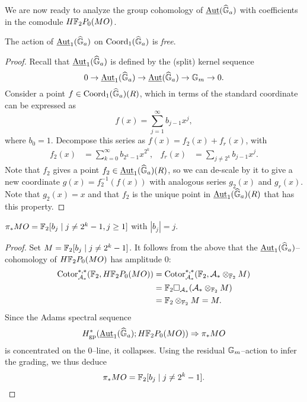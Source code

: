 We are now ready to analyze the group cohomology of $\operatorname{\underline{\smash{\operatorname{Aut}}}}(\widehat{\mathbb G}_a)$ with coefficients in the comodule $H\mathbb F_2P_0(MO)$.
\begin{theorem}
The action of $\operatorname{\underline{\smash{\operatorname{Aut}}}}_1(\widehat{\mathbb G}_a)$ on $\operatorname{Coord}_1(\widehat{\mathbb G}_a)$ is \emph{free}.
\end{theorem}
\begin{proof}
Recall that $\operatorname{\underline{\smash{\operatorname{Aut}}}}_1(\widehat{\mathbb G}_a)$ is defined by the (split) kernel sequence \[0 \to \operatorname{\underline{\smash{\operatorname{Aut}}}}_1(\widehat{\mathbb G}_a) \to \operatorname{\underline{\smash{\operatorname{Aut}}}}(\widehat{\mathbb G}_a) \to \mathbb G_m \to 0.\]  Consider a point $f \in \operatorname{Coord}_1(\widehat{\mathbb G}_a)(R)$, which in terms of the standard coordinate can be expressed as \[f(x) = \sum_{j=1}^\infty b_{j-1} x^j,\] where $b_0 = 1$.  Decompose this series as $f(x) = f_2(x) + f_r(x)$, with
\begin{align*}
f_2(x) & = \sum_{k=0}^\infty b_{2^k-1} x^{2^k}, &
f_r(x) & = \sum_{j \ne 2^k} b_{j-1} x^j.
\end{align*}
Note that $f_2$ gives a point $f_2 \in \operatorname{\underline{\smash{\operatorname{Aut}}}}_1(\widehat{\mathbb G}_a)(R)$, so we can de-scale by it to give a new coordinate $g(x) = f_2^{-1}(f(x))$ with analogous series $g_2(x)$ and $g_r(x)$.  Note that $g_2(x) = x$ and that $f_2$ is the unique point in $\operatorname{\underline{\smash{\operatorname{Aut}}}}_1(\widehat{\mathbb G}_a)(R)$ that has this property.
\end{proof}

\begin{corollary}
$\pi_* MO = \mathbb F_2[b_j \mid j \ne 2^k - 1, j \ge 1]$ with $|b_j| = j$.
\end{corollary}
\begin{proof}
Set $M = \mathbb F_2[b_j \mid j \ne 2^k - 1]$.   It follows from the above that the $\operatorname{\underline{\smash{\operatorname{Aut}}}}_1(\widehat{\mathbb G}_a)$--cohomology of $H\mathbb F_2P_0(MO)$ has amplitude $0$:
\begin{align*}
\operatorname{Cotor}_{\mathcal A_*}^{*, *}(\mathbb F_2, H\mathbb F_2P_0(MO)) & = \operatorname{Cotor}_{\mathcal A_*}^{*, *}(\mathbb F_2, \mathcal A_* \otimes_{\mathbb F_2} M) \\
& = \mathbb F_2 \square_{\mathcal A_*} (\mathcal A_* \otimes_{\mathbb F_2} M) \\
& = \mathbb F_2 \otimes_{\mathbb F_2} M = M.
\end{align*}
Since the Adams spectral sequence \[H^*_{\mathrm{gp}}(\operatorname{\underline{\smash{\operatorname{Aut}}}}_1(\widehat{\mathbb G}_a); H\mathbb F_2P_0(MO)) \Rightarrow \pi_* MO\] is concentrated on the $0$--line, it collapses.  Using the residual $\mathbb G_m$--action to infer the grading, we thus deduce \[\pi_* MO = \mathbb F_2[b_j \mid j \ne 2^k-1]. \qedhere\]
\end{proof}

